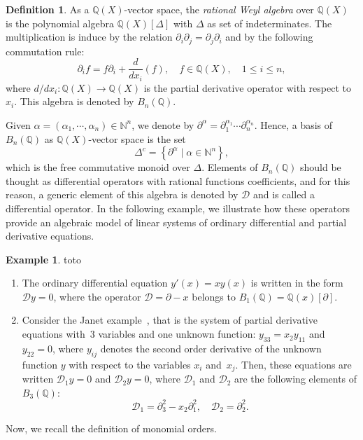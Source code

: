 \documentclass[10pt]{easychair}
\theoremstyle{definition}
\newtheorem{definition}[theorem]{Definition}
\newtheorem{example}[theorem]{Example}
\newcommand\diff[1]{\partial_{#1}}
\newcommand\D{\mathcal{D}}
\newcommand\Q{\mathbb{Q}}
\newcommand\N{\mathbb{N}}
\newcommand\Weyl[1]{B_{#1}(\Q)}
\begin{document}
\begin{definition}
  As a $\Q(X)$-vector space, the {\it rational Weyl algebra} over $\Q(X)$
  is the polynomial algebra $\Q(X)[\Delta]$ with $\Delta$ as set of
  indeterminates. The multiplication is induce by the relation
  $\partial_i \partial_j = \partial_j \partial_i$ and by the following
  commutation rule:
  \[\diff{i}f=f\diff{i}+\frac{d}{dx_i}(f),\quad f\in\Q(X),\quad
  1\leq i\leq n,\]
  where $d/dx_i:\Q(X)\to\Q(X)$ is the partial derivative operator with
  respect to~$x_i$. This algebra is denoted by $\Weyl{n}$.
\end{definition}
\smallskip

Given $\alpha=(\alpha_1,\cdots,\alpha_n)\in\N^n$, we denote by 
$\partial^{\alpha}=\diff{1}^{\alpha_1}\cdots\diff{n}^{\alpha_n}$. Hence, 
a basis of $\Weyl{n}$ as $\Q(X)$-vector space is the set
\[\Delta^c=\left\{\partial^\alpha\mid\alpha\in\N^n\right\},\]
which is the free commutative monoid over $\Delta$. Elements of
$\Weyl{n}$ should be thought as differential operators with rational
functions coefficients, and for this reason, a generic element of this
algebra is denoted by $\D$ and is called a differential operator. In the
following example, we illustrate how these operators provide an algebraic
model of linear systems of ordinary differential and partial derivative
equations.
\smallskip

\begin{example}\label{ex:diff_operators_init}
  {\color{white}toto}
  \begin{enumerate}
  \item The ordinary differential equation $y'(x)=xy(x)$ is written in
    the form $\D y=0$, where the operator $\D=\partial-x$ belongs to
    $\Weyl{1}=\Q(x)[\partial]$.
  \item Consider the Janet example~\cite{MR3532888}, that is the system
    of partial derivative equations with~$3$ variables and one unknown
    function: $y_{33}=x_2y_{11}$ and $y_{22}=0$, where $y_{ij}$ denotes
    the second order derivative of the unknown function $y$ with respect
    to the variables $x_i$ and~$x_j$. Then, these equations are written
    $\D_1y=0$ and $\D_2y=0$, where $\D_1$ and $\D_2$ are the following
    elements of $\Weyl{3}$:
    \[\D_1=\partial_3^2-x_2\partial_1^2,\quad \D_2=\partial_2^2.\]
  \end{enumerate}
\end{example}
\smallskip

Now, we recall the definition of monomial orders.
\smallskip
\end{document}
